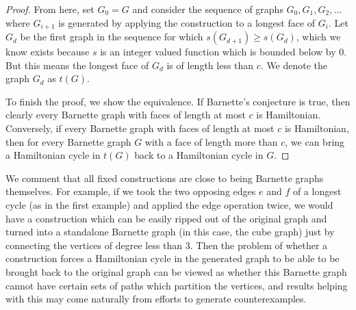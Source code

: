 \documentclass{scrartcl}
\theoremstyle{definition}
\theoremstyle{plain}
\begin{document}
\begin{proof}
    From here, set $G_0=G$ and consider the sequence of graphs $G_0,G_1,G_2,\dots$ where $G_{i+1}$
    is generated by applying the construction to a longest face of $G_i$.
    Let $G_d$ be the first graph in the sequence for which $s(G_{d+1})\geq s(G_d)$, which we know
    exists because $s$ is an integer valued function which is bounded below by $0$.
    But this means the longest face of $G_d$ is of length less than $c$.
    We denote the graph $G_d$ as $t(G)$.
    
    To finish the proof, we show the equivalence.
    If Barnette's conjecture is true, then clearly every Barnette graph with faces of length at
    most $c$ is Hamiltonian.
    Conversely, if every Barnette graph with faces of length at most $c$ is Hamiltonian, then for
    every Barnette graph $G$ with a face of length more than $c$, we can bring a Hamiltonian cycle
    in $t(G)$ back to a Hamiltonian cycle in $G$.
\end{proof}

We comment that all fixed constructions are close to being Barnette graphs themselves.
For example, if we took the two opposing edges $e$ and $f$ of a longest cycle (as in the first
example) and applied the edge operation twice, we would have a construction which can be easily
ripped out of the original graph and turned into a standalone Barnette graph (in this case, the
cube graph) just by connecting the vertices of degree less than 3.
Then the problem of whether a construction forces a Hamiltonian cycle in the generated graph to be
able to be brought back to the original graph can be viewed as whether this Barnette graph cannot
have certain sets of paths which partition the vertices, and results helping with this may come
naturally from efforts to generate counterexamples.
\end{document}
